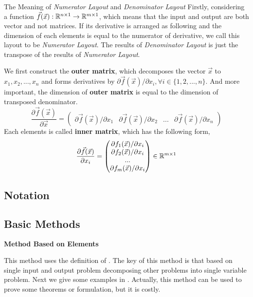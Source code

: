 	\begin{Notes}{The Meaning of \emph{Numerator Layout} and \emph{Denominator Layout}}{} \label{Notes 1}
		Firstly, considering a function $\vec f (\vec x):\mathbb{R}^{n\times 1}\rightarrow \mathbb{R}^{m\times 1}$, which means that the input and output are both vector and not matrices. If its derivative is arranged as following and the dimension of each elements is equal to the numerator of derivative, we call this layout to be \emph{Numerator Layout}. The results of \emph{Denominator Layout} is just the transpose of the results of \emph{Numerator Layout}. 
		
		We first construct the \textbf{outer matrix}, which decomposes the vector $\vec x$ to $x_1,x_2,...,x_n$ and forms derivatives by ${\partial \vec f (\vec x)}/{\partial x_i},\forall i \in \{1,2,...,n\}$. And more important, the dimension of \textbf{outer matrix} is equal to the dimension of transposed denominator.
		$$
		\frac{\partial \vec f (\vec x)}{\partial \vec x}=\begin{pmatrix} {\partial \vec f (\vec x)}/{\partial  x_1} & {\partial \vec f (\vec x)}/{\partial x_2} & ... & {\partial \vec f (\vec x)}/{\partial x_n}\end{pmatrix}
		$$
		Each elements is called \textbf{inner matrix}, which has the following form,
		$$
		\frac{\partial \vec f (\vec x)}{\partial x_i} = \begin{pmatrix} {\partial f_1 (\vec x)}/{\partial  x_i} \\ {\partial f_2 (\vec x)}/{\partial x_i}\\ ... \\ {\partial f_m (\vec x)}/{\partial x_i}\end{pmatrix}
		\in \mathbb{R}^{m\times 1}$$
	\end{Notes}

	\subsection{Notation}
		
	\subsection{Basic Methods}
		\textbf{Method Based on Elements} \\
		 \par This method uses the definition of . The key of this method is that based on single input and output problem decomposing other problems into single variable problem. Next we give some examples in . Actually, this method can be used to prove some theorems or formulation, but it is costly.\\
		 
